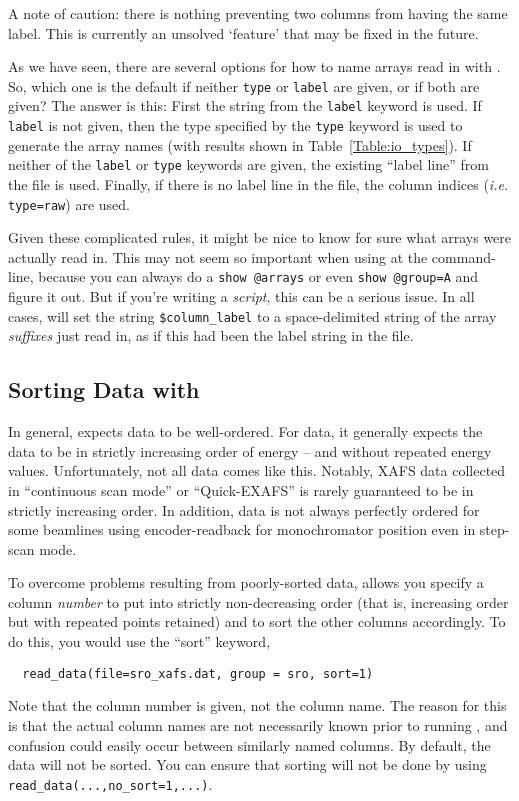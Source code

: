 A note of caution: there is nothing preventing two columns from having the
same label.  This is currently an unsolved `feature' that may be fixed in
the future.

As we have seen, there are several options for how to name arrays read in
with {}.  So, which one is the default if neither
{\tt{type}} or {\tt{label}} are given, or if both are given?  The answer is
this: First the string from the {\tt{label}} keyword is used.  If
{\tt{label}} is not given, then the type specified by the {\tt{type}}
keyword is used to generate the array names (with results shown in
Table~{\ref{Table:io_types}}).  If neither of the {\tt{label}} or
{\tt{type}} keywords are given, the existing ``label line'' from the file
is used.  Finally, if there is no label line in the file, the column
indices ({\emph{i.e.}} {\tt{type=raw}}) are used.

Given these complicated rules, it might be nice to know for sure what
arrays were actually read in.  This may not seem so important when using
{\ifeffit} at the command-line, because you can always do a {\tt{show
    @arrays}} or even {\tt{show @group=A}} and figure it out.  But if
you're writing a {\emph{script}}, this can be a serious issue.  In all
cases, {} will set the string {\tt{\$column\_label}} to a
space-delimited string of the array {\emph{suffixes}} just read in, as if
this had been the label string in the file.


\subsection{Sorting Data with {}} \label{Ch:IO-SORT}

{}
In general, {\ifeffit} expects data to be well-ordered.  For {\muE} data,
it generally expects the data to be in strictly increasing order of energy
-- and without repeated energy values.  Unfortunately, not all data comes
like this.  Notably, XAFS data collected in ``continuous scan mode'' or
``Quick-EXAFS'' is rarely guaranteed to be in strictly increasing order.
In addition, data is not always perfectly ordered for some beamlines using
encoder-readback for monochromator position even in step-scan mode.

To overcome problems resulting from poorly-sorted data, {}
allows you specify a column {\emph{number}} to put into strictly
non-decreasing order (that is, increasing order but with repeated points
retained) and to sort the other columns accordingly.  To do this, you would
use the ``sort'' keyword,
\begin{verbatim}
  read_data(file=sro_xafs.dat, group = sro, sort=1)
\end{verbatim}
\noindent
Note that the column number is given, not the column name.  The reason for
this is that the actual column names are not necessarily known prior to
running {}, and confusion could easily occur between
similarly named columns.  By default, the data will not be sorted.  You can
ensure that sorting will not be done by using
{\texttt{read\_data(...,no\_sort=1,...)}}.

